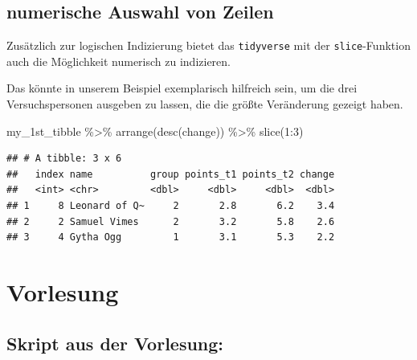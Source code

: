 \documentclass[
]{book}
\newenvironment{Shaded}{\begin{snugshade}}{\end{snugshade}}
\newcommand{\DecValTok}[1]{\textcolor[rgb]{0.00,0.00,0.81}{#1}}
\newcommand{\FunctionTok}[1]{\textcolor[rgb]{0.00,0.00,0.00}{#1}}
\newcommand{\NormalTok}[1]{#1}
\newcommand{\SpecialCharTok}[1]{\textcolor[rgb]{0.00,0.00,0.00}{#1}}
\begin{document}
\hypertarget{numerische-auswahl-von-zeilen}{%
\subsection{numerische Auswahl von Zeilen}\label{numerische-auswahl-von-zeilen}}

Zusätzlich zur logischen Indizierung bietet das \texttt{tidyverse} mit der \texttt{slice}-Funktion auch die Möglichkeit numerisch zu indizieren.

Das könnte in unserem Beispiel exemplarisch hilfreich sein, um die drei Versuchspersonen ausgeben zu lassen, die die größte Veränderung gezeigt haben.

\begin{Shaded}
\begin{Highlighting}[]
\NormalTok{my\_1st\_tibble }\SpecialCharTok{\%\textgreater{}\%} 
  \FunctionTok{arrange}\NormalTok{(}\FunctionTok{desc}\NormalTok{(change)) }\SpecialCharTok{\%\textgreater{}\%} 
  \FunctionTok{slice}\NormalTok{(}\DecValTok{1}\SpecialCharTok{:}\DecValTok{3}\NormalTok{)}
\end{Highlighting}
\end{Shaded}

\begin{verbatim}
## # A tibble: 3 x 6
##   index name          group points_t1 points_t2 change
##   <int> <chr>         <dbl>     <dbl>     <dbl>  <dbl>
## 1     8 Leonard of Q~     2       2.8       6.2    3.4
## 2     2 Samuel Vimes      2       3.2       5.8    2.6
## 3     4 Gytha Ogg         1       3.1       5.3    2.2
\end{verbatim}

\hypertarget{vorlesung}{%
\section{Vorlesung}\label{vorlesung}}

\hypertarget{skript-aus-der-vorlesung}{%
\subsection{Skript aus der Vorlesung:}\label{skript-aus-der-vorlesung}}
\end{document}
